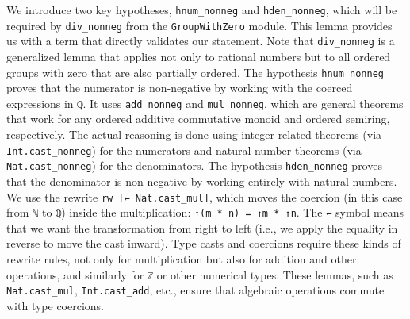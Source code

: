 \begin{example}
  We introduce two key hypotheses, \lstinline[language=lean]|hnum_nonneg|
  and \lstinline[language=lean]|hden_nonneg|, which will be required by
  \lstinline[language=lean]|div_nonneg| from the
  \lstinline[language=lean]|GroupWithZero| module.
  This lemma provides us with a term that directly validates our statement.
  Note that \lstinline[language=lean]|div_nonneg| is a generalized lemma that applies
  not only to rational numbers but to all ordered groups with zero that are
  also partially ordered.
  The hypothesis \lstinline[language=lean]|hnum_nonneg| proves that the numerator
  is non-negative by working with the coerced expressions in
  \lstinline[language=lean]|ℚ|. It uses \lstinline[language=lean]|add_nonneg| and
  \lstinline[language=lean]|mul_nonneg|, which are general theorems that work for
  any ordered additive commutative monoid and ordered semiring, respectively.
  The actual reasoning is done using integer-related theorems
  (via \lstinline[language=lean]|Int.cast_nonneg|) for the numerators and natural
  number theorems (via \lstinline[language=lean]|Nat.cast_nonneg|) for the denominators.
  The hypothesis \lstinline[language=lean]|hden_nonneg| proves that the
  denominator is non-negative by working entirely with natural numbers.
  We use the rewrite \lstinline[language=lean]|rw [← Nat.cast_mul]|,
  which moves the coercion (in this case from \lstinline[language=lean]|ℕ|
  to \lstinline[language=lean]|ℚ|) inside the multiplication:
  \lstinline[language=lean]|↑(m * n) = ↑m * ↑n|. The \lstinline[language=lean]|←|
  symbol means that we want the transformation from right to
  left (i.e., we apply the equality in reverse to move the cast inward).
  Type casts and coercions require these kinds of rewrite rules, not only
  for multiplication but also for addition and other operations, and
  similarly for \lstinline[language=lean]|ℤ| or other numerical types.
  These lemmas, such as \lstinline[language=lean]|Nat.cast_mul|,
  \lstinline[language=lean]|Int.cast_add|, etc., ensure that algebraic operations
  commute with type coercions.
\end{example}
